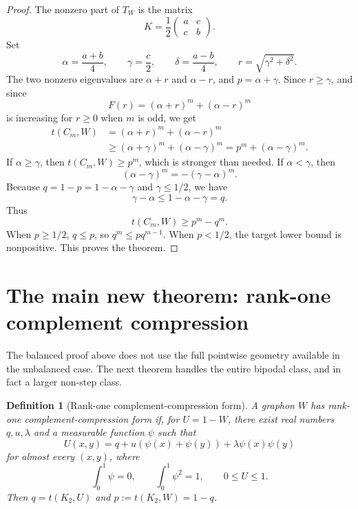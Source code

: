 \documentclass[11pt]{article}
\newtheorem{definition}[theorem]{Definition}
\begin{document}
\begin{proof}
The nonzero part of $T_W$ is the matrix
\[
        K=\frac12\begin{pmatrix}a&c\\ c&b\end{pmatrix}.
\]
Set
\[
        \alpha=\frac{a+b}{4},
        \qquad \gamma=\frac c2,
        \qquad \delta=\frac{a-b}{4},
        \qquad r=\sqrt{\gamma^2+\delta^2}.
\]
The two nonzero eigenvalues are $\alpha+r$ and $\alpha-r$, and $p=\alpha+\gamma$.  Since $r\ge\gamma$, and since
\[
        F(r)=(\alpha+r)^m+(\alpha-r)^m
\]
is increasing for $r\ge0$ when $m$ is odd, we get
\[
\begin{aligned}
        t(C_m,W)
        &=(\alpha+r)^m+(\alpha-r)^m       \\
        &\ge (\alpha+\gamma)^m+(\alpha-\gamma)^m
        =p^m+(\alpha-\gamma)^m.
\end{aligned}
\]
If $\alpha\ge\gamma$, then $t(C_m,W)\ge p^m$, which is stronger than needed.  If $\alpha<\gamma$, then
\[
        (\alpha-\gamma)^m=-(\gamma-\alpha)^m.
\]
Because $q=1-p=1-\alpha-\gamma$ and $\gamma\le1/2$, we have
\[
        \gamma-\alpha\le1-\alpha-\gamma=q.
\]
Thus
\[
        t(C_m,W)\ge p^m-q^m.
\]
When $p\ge1/2$, $q\le p$, so $q^m\le pq^{m-1}$.  When $p<1/2$, the target lower bound is nonpositive.  This proves the theorem.
\end{proof}

\section{The main new theorem: rank-one complement compression}

The balanced proof above does not use the full pointwise geometry available in the unbalanced case.  The next theorem handles the entire bipodal class, and in fact a larger non-step class.

\begin{definition}[Rank-one complement-compression form]\label{def:rank-one-form}
A graphon $W$ has rank-one complement-compression form if, for $U=1-W$, there exist real numbers $q,u,\lambda$ and a measurable function $\psi$ such that
\begin{equation}\label{eq:rank-one-form}
        U(x,y)=q+u(\psi(x)+\psi(y))+\lambda\psi(x)\psi(y)
\end{equation}
for almost every $(x,y)$, where
\[
        \int_0^1\psi=0,
        \qquad
        \int_0^1\psi^2=1,
        \qquad
        0\le U\le1.
\]
Then $q=t(K_2,U)$ and $p:=t(K_2,W)=1-q$.
\end{definition}
\end{document}
